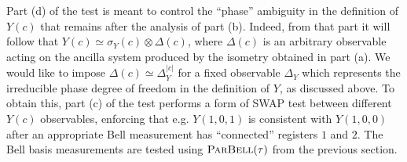 Part (d) of the test is meant to control the ``phase'' ambiguity in the definition of $Y(c)$ that remains after the analysis of part (b). Indeed, from that part it will follow that $Y(c) \simeq \sigma_Y(c) \otimes \Delta(c)$, where $\Delta(c)$ is an arbitrary observable acting on the ancilla system produced by the isometry obtained in part (a). We would like to impose $\Delta(c) \simeq \Delta_Y^{|c|}$ for a fixed observable $\Delta_Y$ which  represents the irreducible phase degree of freedom in the definition of $Y$, as discussed above. To obtain this, part (c) of the test performs a form of SWAP test between different $Y(c)$ observables, enforcing that e.g. $Y(1,0,1)$ is consistent with $Y(1,0,0)$ after an appropriate Bell measurement has ``connected'' registers $1$ and $2$. The Bell basis measurements are tested using $\textsc{ParBell}(\tau)$ from the previous section. 


